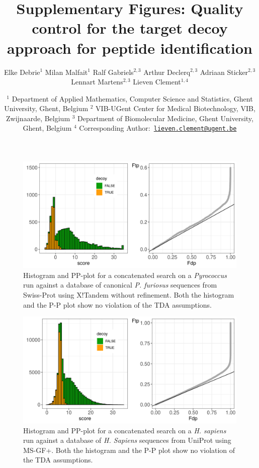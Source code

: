 \documentclass[
]{article}
\title{Supplementary Figures: Quality control for the target decoy approach for peptide identification}
\author{Elke Debrie\(^1\) Milan Malfait\(^1\) Ralf Gabriels\(^{2,3}\) Arthur Declerq\(^{2,3}\) Adriaan Sticker\(^{2,3}\) Lennart Martens\(^{2,3}\) Lieven Clement\(^{1,4}\)}
\date{\(^1\) Department of Applied Mathematics, Computer Science and Statistics, Ghent University, Ghent, Belgium \newline \(^2\) VIB-UGent Center for Medical Biotechnology, VIB, Zwijnaarde, Belgium \newline \(^3\) Department of Biomolecular Medicine, Ghent University, Ghent, Belgium \newline \(^4\) Corresponding Author\(:\) \href{mailto:lieven.clement@ugent.be}{\nolinkurl{lieven.clement@ugent.be}}}
\begin{document}
\maketitle

\def\citenumfont{}



\begin{figure}
\includegraphics[width=0.99\linewidth]{./figs/figTandemNoRefineSwissHistPP} \caption{Histogram and PP-plot for a concatenated search on a \emph{Pyrococcus} run against a database of canonical \emph{P. furiosus} sequences from Swiss-Prot using X!Tandem without refinement. Both the histogram and the P-P plot show no violation of the TDA assumptions.}\label{fig:sFig1}
\end{figure}



\begin{figure}
\includegraphics[width=0.99\linewidth]{./figs/figHumanMsgfPlus} \caption{Histogram and PP-plot for a concatenated search on a \emph{H. sapiens} run against a database of \emph{H. Sapiens} sequences from UniProt using MS-GF+. Both the histogram and the P-P plot show no violation of the TDA assumptions.}\label{fig:sFig2}
\end{figure}
\end{document}
